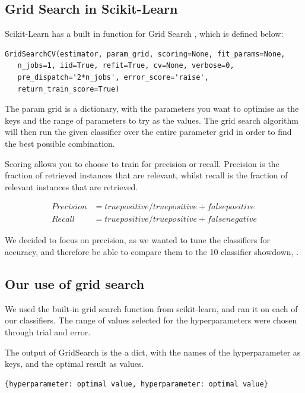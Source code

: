 \documentclass{article}
\begin{document}
	\subsection{Grid Search in Scikit-Learn}
	
		Scikit-Learn has a built in function for Grid Search \cite{gridsearch}, which is defined below:
		
		
	\begin{lstlisting}
GridSearchCV(estimator, param_grid, scoring=None, fit_params=None, 
   n_jobs=1, iid=True, refit=True, cv=None, verbose=0, 
   pre_dispatch='2*n_jobs', error_score='raise',
   return_train_score=True)
	\end{lstlisting}
		
		The param \textunderscore grid is a dictionary, with the parameters you want to optimise as the keys and the range of parameters to try as the values. The grid search algorithm will then run the given classifier over the entire parameter grid in order to find the best possible combination. 
		
		Scoring allows you to choose to train for precision or recall. Precision is the fraction of retrieved instances that are relevant, whilst recall is the fraction of relevant instances that are retrieved.
		
		\begin{align*}
		Precision &= true positive / true positive + false positive\\
		Recall &= true positive / true positive + false negative 
		\end{align*}
		
		We decided to focus on precision, as we wanted to tune the classifiers for accuracy, and therefore be able to compare them to the 10 classifier showdown, \cite{showdown}. 
		
\subsection{Our use of grid search}
		We used the built-in grid search function from scikit-learn, and ran it on each of our classifiers. The range of values selected for the hyperparameters were chosen through trial and error. 

		
		The output of GridSearch is the a dict, with the names of the hyperparameter as keys, and the optimal result as values. 
		
		\begin{lstlisting}
{hyperparameter: optimal value, hyperparameter: optimal value}
		\end{lstlisting}
\end{document}
